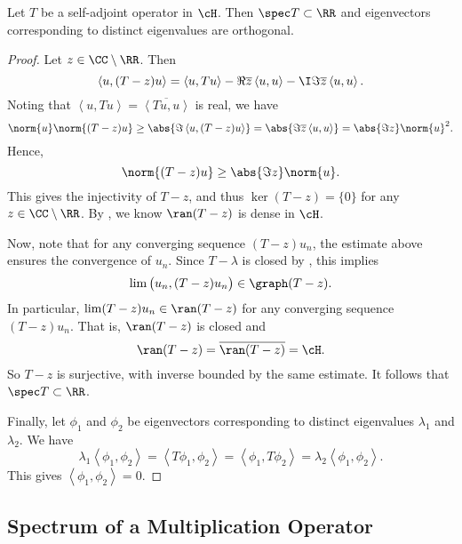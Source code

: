 \documentclass[oneside,reqno,letterpaper]{amsart}
\begin{document}
\begin{theorem}
\label{thm:self-adjoint-spectrum}
  Let \(T\) be a self-adjoint operator in \(\cH\). 
  Then \(\spec T \subset \RR\) and eigenvectors corresponding to distinct eigenvalues are orthogonal.
\end{theorem}
\begin{proof}
  Let \(z \in \CC \setminus \RR\). Then 
  \[
    \left< u, (T - z) u \right> = \left< u, Tu \right> - \Re \overline{z}\left< u, u \right> - \I \Im \overline{z}\left< u, u \right>. 
  \] 
  Noting that \(\left< u, Tu \right> = \overline{\left< Tu, u \right>}\) is real, we have 
  \[
    \norm{u} \norm{(T - z)u}
    \geq \abs{\Im \left< u, (T - z) u \right>} 
    = \abs{\Im \overline{z} \left< u, u \right>} 
    = \abs{\Im z} \norm{u}^2 . 
  \] 
  Hence, 
  \[
    \norm{(T - z) u} \geq \abs{\Im z} \norm{u} .
  \] 
  This gives the injectivity of \(T - z\), and thus \(\ker(T - z) = \{0\}\) for any \(z \in \CC \setminus \RR\). 
  By , we know \(\ran(T - z)\) is dense in \(\cH\).  

  Now, note that for any converging sequence \((T - z) u_n\), the estimate above ensures the convergence of \(u_n\). 
  Since \(T - \lambda\) is closed by , this implies 
  \[
    \lim \big( u_n, (T - z) u_n \big) \in \graph(T - z). 
  \] 
  In particular, \(\lim (T - z) u_n \in \ran(T - z)\) for any converging sequence \((T - z) u_n\).
  That is, \(\ran(T - z)\) is closed and 
  \[
    \ran(T - z) = \overline{\ran(T - z)} = \cH . 
  \]
  So \(T - z\) is surjective, with inverse bounded by the same estimate.
  It follows that \(\spec T \subset \RR\). 

  Finally, let \(\phi_1\) and \(\phi_2\) be eigenvectors corresponding to distinct eigenvalues \(\lambda_1\) and \(\lambda_2\). 
  We have 
  \[
    \lambda_1 \left< \phi_1, \phi_2 \right>
    = \left< T \phi_1, \phi_2 \right>
    = \left< \phi_1, T \phi_2 \right>
    = \lambda_2 \left< \phi_1, \phi_2 \right> . 
  \] 
  This gives \(\left< \phi_1, \phi_2 \right> = 0\). 
\end{proof}






\subsection{Spectrum of a Multiplication Operator}
\end{document}
